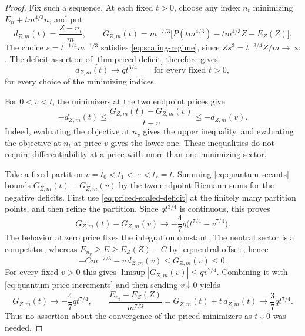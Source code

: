 \begin{proof}
Fix such a sequence.  At each fixed $t>0$, choose any index $n_t$ minimizing
$E_n+tm^{4/3}n$, and put
\[
 d_{Z,m}(t)=\frac{Z-n_t}{m},\qquad
 G_{Z,m}(t)=m^{-7/3}
       \bigl[P(tm^{4/3})-tm^{4/3}Z-E_Z(Z)\bigr].
\]
The choice $s=t^{-1/4}m^{-1/3}$ satisfies
\cref{eq:scaling-regime}, since $Zs^3=t^{-3/4}Z/m\to\infty$.
The deficit assertion of \cref{thm:priced-deficit} therefore gives
\begin{equation}\label{eq:priced-scaled-deficit}
 d_{Z,m}(t)\longrightarrow qt^{3/4}
 \qquad\text{for every fixed }t>0,
\end{equation}
for every choice of the minimizing indices.

For $0<v<t$, the minimizers at the two endpoint prices give
\begin{equation}\label{eq:quantum-secants}
 -d_{Z,m}(t)\le
       \frac{G_{Z,m}(t)-G_{Z,m}(v)}{t-v}
       \le-d_{Z,m}(v).
\end{equation}
Indeed, evaluating the objective at $n_v$ gives the upper inequality,
and evaluating the objective at $n_t$ at price $v$ gives the lower one.
These inequalities do not require differentiability at a price with more
than one minimizing sector.

Take a fixed partition $v=t_0<t_1<\cdots<t_r=t$.  Summing
\cref{eq:quantum-secants} bounds $G_{Z,m}(t)-G_{Z,m}(v)$ by the two endpoint
Riemann sums for the negative deficits.  First use
\cref{eq:priced-scaled-deficit} at the finitely many partition points, and
then refine the partition.  Since $qt^{3/4}$ is continuous, this proves
\begin{equation}\label{eq:quantum-price-increments}
 G_{Z,m}(t)-G_{Z,m}(v)
       \longrightarrow-\frac47q\bigl(t^{7/4}-v^{7/4}\bigr).
\end{equation}
The behavior at zero price fixes the integration constant.  The neutral
sector is a competitor, whereas $E_{n_v}\ge E\ge E_Z(Z)-C$ by
\cref{eq:neutral-offset}; hence
\begin{equation}\label{eq:quantum-zero-endpoint}
 -Cm^{-7/3}-v\,d_{Z,m}(v)\le G_{Z,m}(v)\le0.
\end{equation}
For every fixed $v>0$ this gives
$\limsup|G_{Z,m}(v)|\le qv^{7/4}$.  Combining it with
\cref{eq:quantum-price-increments} and then sending $v\downarrow0$ yields
\begin{equation}\label{eq:quantum-price-energy}
 G_{Z,m}(t)\longrightarrow-\frac47qt^{7/4},\qquad
 \frac{E_{n_t}-E_Z(Z)}{m^{7/3}}
       =G_{Z,m}(t)+t\,d_{Z,m}(t)
       \longrightarrow\frac37qt^{7/4}.
\end{equation}
Thus no assertion about the convergence of the priced minimizers as
$t\downarrow0$ was needed.


\end{proof}
